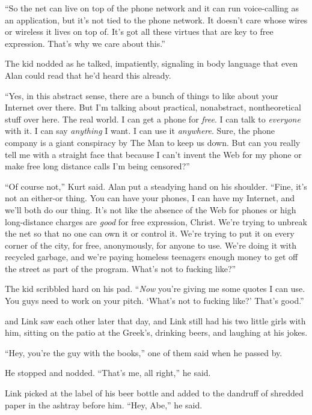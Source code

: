 ``So the net can live on top of the phone network and it can run
voice-calling as an application, but it's not tied to the phone
network.  It doesn't care whose wires or wireless it lives on top of. 
It's got all these virtues that are key to free expression.  That's
why we care about this.''

The kid nodded as he talked, impatiently, signaling in body language
that even Alan could read that he'd heard this already.

``Yes, in this abstract sense, there are a bunch of things to like
about your Internet over there.  But I'm talking about practical,
nonabstract, nontheoretical stuff over here.  The real world.  I can
get a phone for \textit{free}.  I can talk to \textit{everyone} with
it.  I can say \textit{anything} I want.  I can use it
\textit{anywhere}.  Sure, the phone company is a giant conspiracy by
The Man to keep us down.  But can you really tell me with a straight
face that because I can't invent the Web for my phone or make free
long distance calls I'm being censored?''

``Of course not,'' Kurt said.  Alan put a steadying hand on his
shoulder.  ``Fine, it's not an either-or thing.  You can have your
phones, I can have my Internet, and we'll both do our thing.  It's not
like the absence of the Web for phones or high long-distance charges
are \textit{good} for free expression, Christ.  We're trying to
unbreak the net so that no one can own it or control it.  We're trying
to put it on every corner of the city, for free, anonymously, for
anyone to use.  We're doing it with recycled garbage, and we're paying
homeless teenagers enough money to get off the street as part of the
program.  What's not to fucking like?''

The kid scribbled hard on his pad.  ``\textit{Now} you're giving me
some quotes I can use.  You guys need to work on your pitch.  `What's
not to fucking like?' That's good.''

 and Link saw each other later that day, and Link still had his two
little girls with him, sitting on the patio at the Greek's, drinking
beers, and laughing at his jokes.

``Hey, you're the guy with the books,'' one of them said when he
passed by. 

He stopped and nodded.  ``That's me, all right,'' he said.

Link picked at the label of his beer bottle and added to the dandruff
of shredded paper in the ashtray before him.  ``Hey, Abe,'' he said.

